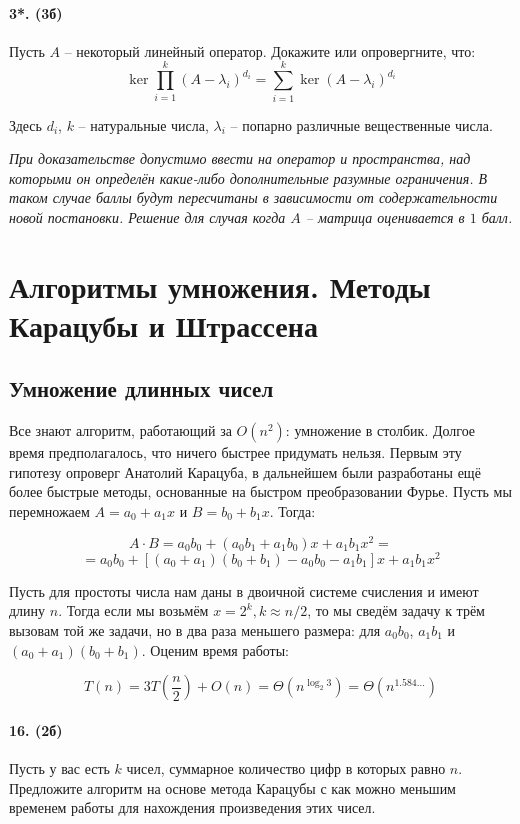 \documentclass{article}
\begin{document}
\paragraph{3*. (3б)} Пусть $A$ -- некоторый линейный оператор. Докажите или опровергните, что:
\begin{equation*}
    \ker \prod\limits_{i=1}^k (A-\lambda_i)^{d_i} = \sum\limits_{i=1}^k \ker (A-\lambda_i)^{d_i}
\end{equation*}

Здесь $d_i$, $k$ -- натуральные числа, $\lambda_i$ -- попарно различные вещественные числа.
\newline

\textit{При доказательстве допустимо ввести на оператор и пространства, над которыми он определён какие-либо дополнительные разумные ограничения. В таком случае баллы будут пересчитаны в зависимости от содержательности новой постановки. Решение для случая когда $A$ -- матрица оценивается в $1$ балл.}

\section*{Алгоритмы умножения. Методы Карацубы и Штрассена}
\subsection*{Умножение длинных чисел}
Все знают алгоритм, работающий за $O(n^2)$: умножение в столбик. Долгое время предполагалось, что ничего быстрее придумать нельзя. Первым эту гипотезу опроверг Анатолий Карацуба, в дальнейшем были разработаны ещё более быстрые методы, основанные на быстром преобразовании Фурье. Пусть мы перемножаем $A=a_0+a_1x$ и $B=b_0+b_1x$. Тогда:

$$A \cdot B = a_0 b_0 + (a_0b_1+a_1b_0)x + a_1b_1x^2=$$
$$=a_0 b_0 + [(a_0+a_1)(b_0+b_1)-a_0b_0-a_1b_1] x + a_1 b_1 x^2$$

Пусть для простоты числа нам даны в двоичной системе счисления и имеют длину $n$. Тогда если мы возьмём $x=2^k, k \approx n/2$, то мы сведём задачу к трём вызовам той же задачи, но в два раза меньшего размера: для $a_0b_0$, $a_1b_1$ и $(a_0+a_1)(b_0+b_1)$. Оценим время работы:

$$T(n)=3T\left(\dfrac n 2\right)+O(n)=\Theta\left(n^{\log_2 3}\right)=\Theta(n^{1.584\dots})$$

\paragraph{16. (2б)} Пусть у вас есть $k$ чисел, суммарное количество цифр в которых равно $n$. Предложите алгоритм на основе метода Карацубы с как можно меньшим временем работы для нахождения произведения этих чисел.
\end{document}

